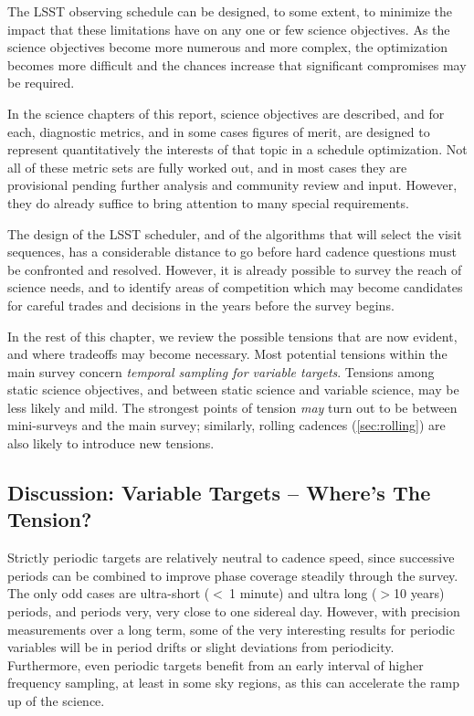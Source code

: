 The LSST observing schedule can be designed, to some extent, to minimize
the impact that these limitations have on any one or few science
objectives. As the science objectives become more numerous and more
complex, the optimization becomes more difficult and the chances
increase that significant compromises may be required.

In the science chapters of this report, science objectives are
described, and for each, diagnostic metrics, and in some cases figures
of merit, are designed to represent quantitatively the interests of that
topic in a schedule optimization.  Not all of these metric sets are
fully worked out, and in most cases they are provisional pending further
analysis and community review and input.  However, they do already
suffice to bring attention to many special requirements.

The design of the LSST scheduler, and of the algorithms that will select
the visit sequences, has a considerable distance to go before hard
cadence questions must be confronted and resolved.  However, it is
already possible to survey the reach of science needs, and to identify
areas of competition which may become candidates for careful trades and
decisions in the years before the survey begins.

In the rest of this chapter, we review the possible tensions that are
now evident, and where tradeoffs may become necessary. Most potential
tensions within the main survey concern {\it temporal sampling for
variable targets}.  Tensions among static science objectives, and
between static science and variable science, may be less likely and
mild. The strongest points of tension {\it may} turn out to be between
mini-surveys and the main survey; similarly, rolling cadences (\autoref{sec:rolling}) are also likely to introduce new tensions.


\subsection{Discussion: Variable Targets -- Where's The Tension?}

Strictly periodic targets are relatively neutral to cadence speed, since
successive periods can be combined to improve phase coverage steadily
through the survey.  The only odd cases are ultra-short ($<~ $1 minute)
and ultra long ($> $10 years) periods, and periods very, very close to
one sidereal day.  However, with precision measurements over a long
term, some of the very interesting results for periodic variables will
be in period drifts or slight deviations from periodicity. Furthermore,
even periodic targets benefit from an early interval of higher frequency
sampling, at least in some sky regions, as this can accelerate the ramp
up of the science.

